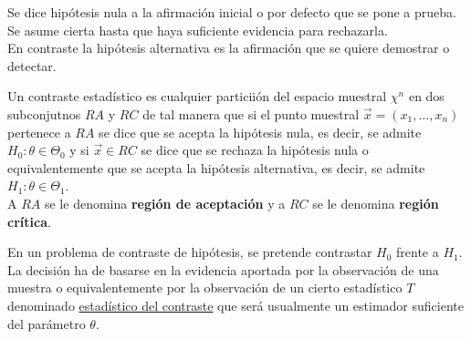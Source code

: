 \begin{definición} 
    Se dice hipótesis nula a la afirmación inicial o por defecto que se pone a prueba. Se asume cierta hasta que haya suficiente evidencia para rechazarla. \\
    En contraste la hipótesis alternativa es la afirmación que se quiere demostrar o detectar. 
\end{definición}


\begin{definición} 
    Un contraste estadístico es cualquier particiión del espacio muestral $\chi^{n}$ en dos subconjutnos $RA$ y $RC$ de tal manera que si el punto muestral $\vec{x} = (x_1, \ldots, x_n)$ pertenece a $RA$ se dice que se acepta la hipótesis nula, es decir, se admite $H_0: \theta \in \Theta_0$ y si $\vec{x} \in RC$ se dice que se rechaza la hipótesis nula o equivalentemente que se acepta la hipótesis alternativa, es decir, se admite $H_1: \theta \in \Theta_1$. \\ 
    A $RA$ se le denomina \textbf{región de aceptación} y a $RC$ se le denomina \textbf{región crítica}. 
\end{definición}


\begin{definición}
    En un problema de contraste de hipótesis, se pretende contrastar $H_0$ frente a $H_1$. La decisión ha de basarse en la evidencia aportada por la observación de una muestra o equivalentemente por la observación de un cierto estadístico $T$ denominado \underline{estadístico del contraste} que será usualmente un estimador suficiente del parámetro $\theta$.
\end{definición}

